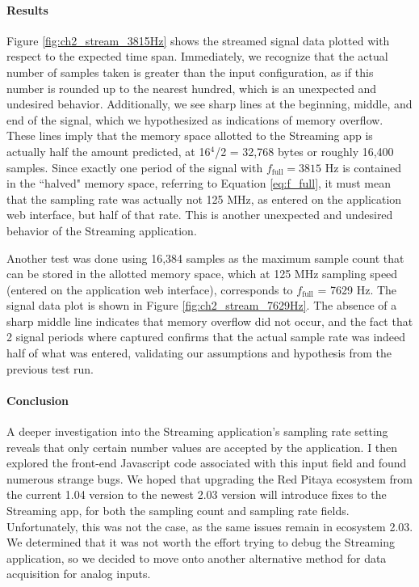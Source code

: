 \paragraph{Results}

Figure \ref{fig:ch2_stream_3815Hz} shows the streamed signal data plotted with respect to the expected time span. Immediately, we recognize that the actual number of samples taken is greater than the input configuration, as if this number is rounded up to the nearest hundred, which is an unexpected and undesired behavior. Additionally, we see sharp lines at the beginning, middle, and end of the signal, which we hypothesized as indications of memory overflow. These lines imply that the memory space allotted to the Streaming app is actually half the amount predicted, at 16$^4$/2 = 32,768 bytes or roughly 16,400 samples. Since exactly one period of the signal with $f_\text{full} = 3815$ Hz is contained in the ``halved" memory space, referring to Equation \eqref{eq:f_full}, it must mean that the sampling rate was actually not 125 MHz, as entered on the application web interface, but half of that rate. This is another unexpected and undesired behavior of the Streaming application.

Another test was done using 16,384 samples as the maximum sample count that can be stored in the allotted memory space, which at 125 MHz sampling speed (entered on the application web interface), corresponds to $f_\text{full}$ = 7629 Hz. The signal data plot is shown in Figure \ref{fig:ch2_stream_7629Hz}. The absence of a sharp middle line indicates that memory overflow did not occur, and the fact that 2 signal periods where captured confirms that the actual sample rate was indeed half of what was entered, validating our assumptions and hypothesis from the previous test run.


\paragraph{Conclusion}

A deeper investigation into the Streaming application's sampling rate setting reveals that only certain number values are accepted by the application. I then explored the front-end Javascript code associated with this input field and found numerous strange bugs. We hoped that upgrading the Red Pitaya ecosystem from the current 1.04 version to the newest 2.03 version will introduce fixes to the Streaming app, for both the sampling count and sampling rate fields. Unfortunately, this was not the case, as the same issues remain in ecosystem 2.03. We determined that it was not worth the effort trying to debug the Streaming application, so we decided to move onto another alternative method for data acquisition for analog inputs.